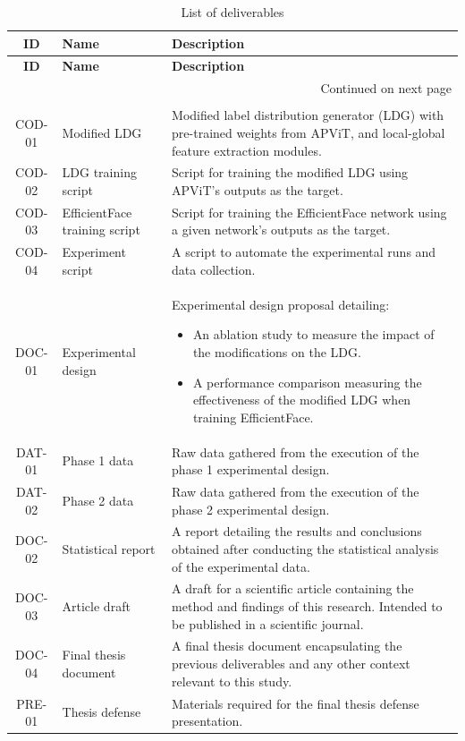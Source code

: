 \begin{center}
\begin{longtable}{cp{}p{}}
\label{tab:deliverables}\\
\toprule
\textbf{ID} & \textbf{Name} & \textbf{Description} \\ 
\midrule
\endfirsthead

\toprule
\textbf{ID} & \textbf{Name} & \textbf{Description} \\ 
\midrule
\endhead

\midrule
\multicolumn{3}{r}{{Continued on next page}} \\
\endfoot

\bottomrule
\caption{List of deliverables}\\
\endlastfoot

COD-01\label{ac:cod-01} & Modified LDG & Modified label distribution generator (LDG) with pre-trained weights from APViT, and local-global feature extraction modules. \\ 
COD-02\label{ac:cod-02} & LDG training script & Script for training the modified LDG using APViT’s outputs as the target. \\ 
COD-03\label{ac:cod-03} & EfficientFace training script & Script for training the EfficientFace network using a given network's outputs as the target. \\ 
COD-04 & Experiment script & A script to automate the experimental runs and data collection. \\ 
DOC-01 & Experimental design & Experimental design proposal detailing:
\begin{itemize}
    \item An ablation study to measure the impact of the modifications on the LDG.
    \item A performance comparison measuring the effectiveness of the modified LDG when training EfficientFace.
\end{itemize} \\ 
DAT-01 & Phase 1 data & Raw data gathered from the execution of the phase 1 experimental design.\\
DAT-02 & Phase 2 data & Raw data gathered from the execution of the phase 2 experimental design.\\
DOC-02 & Statistical report & A report detailing the results and conclusions obtained after conducting the statistical analysis of the experimental data. \\ 
DOC-03 & Article draft & A draft for a scientific article containing the method and findings of this research. Intended to be published in a scientific journal. \\ 
DOC-04 & Final thesis document & A final thesis document encapsulating the previous deliverables and any other context relevant to this study. \\ 
PRE-01 & Thesis defense & Materials required for the final thesis defense presentation.\\ 

\end{longtable}
\end{center}